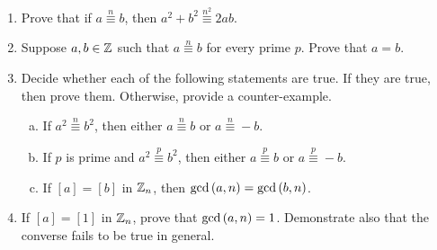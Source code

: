 \documentclass[11pt,fleqn,dvipsnames,usenames]{article}
\begin{document}
\begin{enumerate}
\item Prove that if $a\overset{n}{\equiv}b$, then $a^2 + b^2\overset{n^2}{\equiv}2ab$.
\item Suppose $a,b\in\mathbb{Z}$ such that $a\overset{n}{\equiv}b$ for every prime $p$.  Prove that $a=b$.
\item Decide whether each of the following statements are true.  If they are true, then prove them.  Otherwise, provide a counter-example.
\begin{enumerate}[(a)]
\item If $a^2\overset{n}{\equiv}b^2$, then either $a\overset{n}{\equiv}b$ or $a\overset{n}{\equiv}-b$.
\item If $p$ is prime and $a^2\overset{p}{\equiv}b^2$, then either $a\overset{p}{\equiv}b$ or $a\overset{p}{\equiv}-b$.
\item If $[a] = [b]$ in $\mathbb{Z}_{n}$, then $\text{gcd}\left(a,n\right) = \text{gcd}\left(b,n\right)$.
\end{enumerate}
\item If $[a] = [1]$ in $\mathbb{Z}_{n}$, prove that $\text{gcd}\left(a,n\right) = 1$.  Demonstrate also that the converse fails to be true in general.
\end{enumerate}
\end{document}
